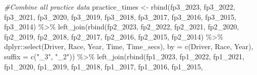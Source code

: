 \documentclass[
]{book}
\newenvironment{Shaded}{\begin{snugshade}}{\end{snugshade}}
\newcommand{\AttributeTok}[1]{\textcolor[rgb]{0.77,0.63,0.00}{#1}}
\newcommand{\CommentTok}[1]{\textcolor[rgb]{0.56,0.35,0.01}{\textit{#1}}}
\newcommand{\FunctionTok}[1]{\textcolor[rgb]{0.00,0.00,0.00}{#1}}
\newcommand{\NormalTok}[1]{#1}
\newcommand{\OtherTok}[1]{\textcolor[rgb]{0.56,0.35,0.01}{#1}}
\newcommand{\SpecialCharTok}[1]{\textcolor[rgb]{0.00,0.00,0.00}{#1}}
\newcommand{\StringTok}[1]{\textcolor[rgb]{0.31,0.60,0.02}{#1}}
\begin{document}
\begin{Shaded}
\begin{Highlighting}[]
\CommentTok{\#Combine all practice data}
\NormalTok{practice\_times }\OtherTok{\textless{}{-}} \FunctionTok{rbind}\NormalTok{(fp3\_2023,}
\NormalTok{                        fp3\_2022,}
\NormalTok{                            fp3\_2021,}
\NormalTok{                            fp3\_2020,}
\NormalTok{                            fp3\_2019,}
\NormalTok{                            fp3\_2018,}
\NormalTok{                            fp3\_2017,}
\NormalTok{                            fp3\_2016,}
\NormalTok{                            fp3\_2015,}
\NormalTok{                            fp3\_2014) }\SpecialCharTok{\%\textgreater{}\%}
  \FunctionTok{left\_join}\NormalTok{(}\FunctionTok{rbind}\NormalTok{(fp2\_2023,}
\NormalTok{                  fp2\_2022,}
\NormalTok{                            fp2\_2021,}
\NormalTok{                            fp2\_2020,}
\NormalTok{                            fp2\_2019,}
\NormalTok{                            fp2\_2018,}
\NormalTok{                            fp2\_2017,}
\NormalTok{                            fp2\_2016,}
\NormalTok{                            fp2\_2015,}
\NormalTok{                            fp2\_2014) }\SpecialCharTok{\%\textgreater{}\%}
\NormalTok{              dplyr}\SpecialCharTok{::}\FunctionTok{select}\NormalTok{(}\StringTok{\textquotesingle{}Driver\textquotesingle{}}\NormalTok{, }\StringTok{\textquotesingle{}Race\textquotesingle{}}\NormalTok{, }\StringTok{\textquotesingle{}Year\textquotesingle{}}\NormalTok{, }\StringTok{\textquotesingle{}Time\textquotesingle{}}\NormalTok{, }\StringTok{\textquotesingle{}Time\_secs\textquotesingle{}}\NormalTok{), }\AttributeTok{by =} \FunctionTok{c}\NormalTok{(}\StringTok{\textquotesingle{}Driver\textquotesingle{}}\NormalTok{, }\StringTok{\textquotesingle{}Race\textquotesingle{}}\NormalTok{, }\StringTok{\textquotesingle{}Year\textquotesingle{}}\NormalTok{), }\AttributeTok{suffix =} \FunctionTok{c}\NormalTok{(}\StringTok{"\_3"}\NormalTok{, }\StringTok{"\_2"}\NormalTok{)) }\SpecialCharTok{\%\textgreater{}\%}
  \FunctionTok{left\_join}\NormalTok{(}\FunctionTok{rbind}\NormalTok{(fp1\_2023,}
\NormalTok{                  fp1\_2022,}
\NormalTok{                            fp1\_2021,}
\NormalTok{                            fp1\_2020,}
\NormalTok{                            fp1\_2019,}
\NormalTok{                            fp1\_2018,}
\NormalTok{                            fp1\_2017,}
\NormalTok{                            fp1\_2016,}
\NormalTok{                            fp1\_2015,}

\end{Highlighting}
\end{Shaded}
\end{document}
